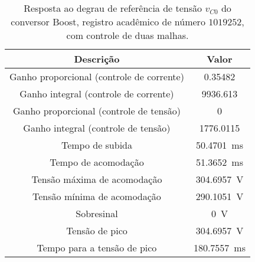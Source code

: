 \begin{table}[!ht]
\centering
\caption{Resposta ao degrau de referência de tensão $v_{C0}$ do conversor Boost, registro acadêmico de número $1019252$, com controle de duas malhas.}
\label{tab:resposta2malhas}
\begin{tabular}{@{}cc@{}}
\toprule
\textbf{Descrição} & \textbf{Valor}\\ \midrule
Ganho proporcional (controle de corrente) & \SI{0.35482}{}\\
Ganho integral (controle de corrente) & \SI{9936.613}{}\\
Ganho proporcional (controle de tensão) & \SI{0}{}\\
Ganho integral (controle de tensão) & \SI{1776.0115}{}\\
Tempo de subida & \SI{50.4701}{\milli\s}\\
Tempo de acomodação & \SI{51.3652}{\milli\s}\\
Tensão máxima de acomodação & \SI{304.6957}{\V}\\
Tensão mínima de acomodação & \SI{290.1051}{\V}\\
Sobresinal & \SI{0}{\V}\\
Tensão de pico & \SI{304.6957}{\V}\\
Tempo para a tensão de pico & \SI{180.7557}{\milli\s}\\
\bottomrule
\end{tabular}
\end{table}

